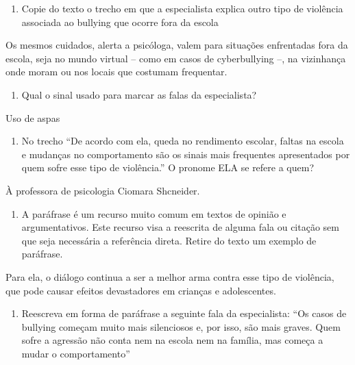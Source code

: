 \begin{enumerate}
\def\labelenumi{\arabic{enumi})}
\setcounter{enumi}{5}
\tightlist
\item
  Copie do texto o trecho em que a especialista explica outro tipo de
  violência associada ao bullying que ocorre fora da escola
\end{enumerate}

Os mesmos cuidados, alerta a psicóloga, valem para situações enfrentadas
fora da escola, seja no mundo virtual -- como em casos de cyberbullying
--, na vizinhança onde moram ou nos locais que costumam frequentar.

\begin{enumerate}
\def\labelenumi{\arabic{enumi})}
\setcounter{enumi}{6}
\tightlist
\item
  Qual o sinal usado para marcar as falas da especialista?
\end{enumerate}

Uso de aspas

\begin{enumerate}
\def\labelenumi{\arabic{enumi})}
\setcounter{enumi}{7}
\tightlist
\item
  No trecho ``De acordo com ela, queda no rendimento escolar, faltas na
  escola e mudanças no comportamento são os sinais mais frequentes
  apresentados por quem sofre esse tipo de violência.'' O pronome ELA se
  refere a quem?
\end{enumerate}

À professora de psicologia Ciomara Shcneider.

\begin{enumerate}
\def\labelenumi{\arabic{enumi})}
\setcounter{enumi}{8}
\tightlist
\item
  A paráfrase é um recurso muito comum em textos de opinião e
  argumentativos. Este recurso visa a reescrita de alguma fala ou
  citação sem que seja necessária a referência direta. Retire do texto
  um exemplo de paráfrase.
\end{enumerate}

Para ela, o diálogo continua a ser a melhor arma contra esse tipo de
violência, que pode causar efeitos devastadores em crianças e
adolescentes.

\begin{enumerate}
\def\labelenumi{\arabic{enumi})}
\setcounter{enumi}{9}
\tightlist
\item
  Reescreva em forma de paráfrase a seguinte fala da especialista: ``Os
  casos de bullying começam muito mais silenciosos e, por isso, são mais
  graves. Quem sofre a agressão não conta nem na escola nem na família,
  mas começa a mudar o comportamento''
\end{enumerate}

